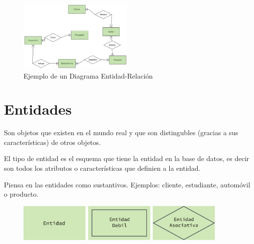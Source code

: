 \documentclass[12pt, fleqn]{report}                             %
\begin{document}
            \begin{figure}[h]
                \centering
                \includegraphics[width=0.50\textwidth]{ER-Diagram}
                \caption{Ejemplo de un Diagrama Entidad-Relación}
            \end{figure}



        \clearpage
        \section{Entidades}
                
            Son objetos que existen en el mundo real y que son distingubles
            (gracias a sus características) de otros objetos.

            El tipo de entidad es el esquema que tiene la entidad en la base de datos,
            es decir son todos los atributos o características que definien a la entidad.

            Piensa en las entidades como sustantivos.
            Ejemplos: cliente, estudiante, automóvil o producto. 


            \begin{figure}[h]
                \centering
                \includegraphics[width=0.30\textwidth]{Entidad}
                \includegraphics[width=0.30\textwidth]{EntidadDebil}
                \includegraphics[width=0.30\textwidth]{EntidadAsociativa}
            \end{figure}
\end{document}
